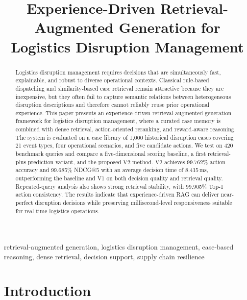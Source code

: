 \documentclass[conference]{IEEEtran}
\begin{document}
\title{Experience-Driven Retrieval-Augmented Generation for Logistics Disruption Management}

\author{
}

\maketitle

\begin{abstract}
Logistics disruption management requires decisions that are simultaneously fast, explainable, and robust to diverse operational contexts. Classical rule-based dispatching and similarity-based case retrieval remain attractive because they are inexpensive, but they often fail to capture semantic relations between heterogeneous disruption descriptions and therefore cannot reliably reuse prior operational experience. This paper presents an experience-driven retrieval-augmented generation framework for logistics disruption management, where a curated case memory is combined with dense retrieval, action-oriented reranking, and reward-aware reasoning. The system is evaluated on a case library of 1,000 historical disruption cases covering 21 event types, four operational scenarios, and five candidate actions. We test on 420 benchmark queries and compare a five-dimensional scoring baseline, a first retrieval-plus-prediction variant, and the proposed V2 method. V2 achieves 99.762\% action accuracy and 99.685\% NDCG@5 with an average decision time of 8.415\,ms, outperforming the baseline and V1 on both decision quality and retrieval quality. Repeated-query analysis also shows strong retrieval stability, with 99.905\% Top-1 action consistency. The results indicate that experience-driven RAG can deliver near-perfect disruption decisions while preserving millisecond-level responsiveness suitable for real-time logistics operations.
\end{abstract}

\begin{IEEEkeywords}
retrieval-augmented generation, logistics disruption management, case-based reasoning, dense retrieval, decision support, supply chain resilience
\end{IEEEkeywords}

\section{Introduction}
\label{sec:introduction}
\end{document}
